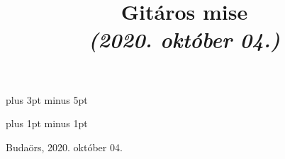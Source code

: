\documentclass[a5paper,twoside]{article}
\title{Gitáros mise\\\textit{(2020. október 04.)}}
\date{}
\renewcommand{\_}[1]{\underline{#1}} %
\begin{document}

  \begin{titlepage}
    \setlength{\oddsidemargin}{-1.625cm}

    \vspace*{4cm}
    {\let\newpage\relax\maketitle}
  \end{titlepage}

  \versesep=12pt plus 3pt minus 5pt

  \iflyric
    \baselineadj=2pt plus 1pt minus 1pt
  \fi


  \begin{songs}{}
    
    






    

    

    
  \end{songs}
  \newpage
  \thispagestyle{empty}

  \vspace*{\fill}
  
  Budaörs, 2020. október 04.
\end{document}
